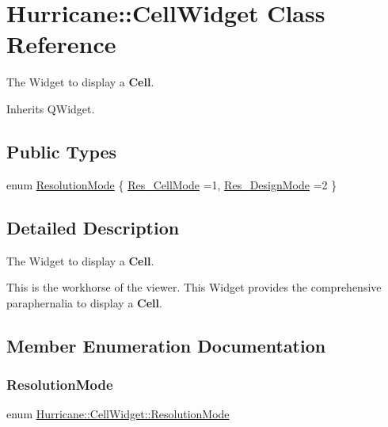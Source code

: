 \hypertarget{classHurricane_1_1CellWidget}{}\section{Hurricane\+:\+:Cell\+Widget Class Reference}
\label{classHurricane_1_1CellWidget}


The Widget to display a \textbf{ Cell}.  




Inherits Q\+Widget.

\subsection*{Public Types}
\begin{DoxyCompactItemize}
\item 
enum \mbox{\hyperlink{classHurricane_1_1CellWidget_a4b81fed78775d491c169b649870d9dd7}{Resolution\+Mode}} \{ \newline
\mbox{\hyperlink{classHurricane_1_1CellWidget_a4b81fed78775d491c169b649870d9dd7af37fd1c10fd363f0ad04a94dbccd5789}{Res\+\_\+\+Cell\+Mode}} =1, 
\newline
\mbox{\hyperlink{classHurricane_1_1CellWidget_a4b81fed78775d491c169b649870d9dd7a0c7c9bd939930fe178b5b8bcd84bdc1e}{Res\+\_\+\+Design\+Mode}} =2
 \}
\end{DoxyCompactItemize}


\subsection{Detailed Description}
The Widget to display a \textbf{ Cell}. 

This is the workhorse of the viewer. This Widget provides the comprehensive paraphernalia to display a \textbf{ Cell}. 

\subsection{Member Enumeration Documentation}
\mbox{\label{classHurricane_1_1CellWidget_a4b81fed78775d491c169b649870d9dd7}} 
\subsubsection{\texorpdfstring{Resolution\+Mode}{ResolutionMode}}
{\footnotesize\ttfamily enum \mbox{\hyperlink{classHurricane_1_1CellWidget_a4b81fed78775d491c169b649870d9dd7}{Hurricane\+::\+Cell\+Widget\+::\+Resolution\+Mode}}}

